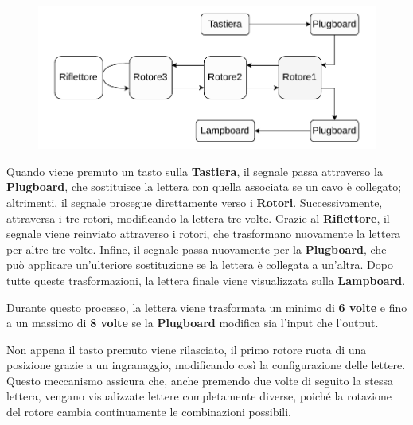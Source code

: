 \documentclass{rapport}
\begin{document}
\begin{figure}[h]
    \centering
    \includegraphics[width=0.9\linewidth]{logos/2_7cripto.pdf}
\end{figure}

Quando viene premuto un tasto sulla \textbf{Tastiera}, il segnale passa attraverso la \textbf{Plugboard}, che sostituisce la lettera con quella associata se un cavo è collegato; altrimenti, il segnale prosegue direttamente verso i \textbf{Rotori}. Successivamente, attraversa i tre rotori, modificando la lettera tre volte. Grazie al \textbf{Riflettore}, il segnale viene reinviato attraverso i rotori, che trasformano nuovamente la lettera per altre tre volte. Infine, il segnale passa nuovamente per la \textbf{Plugboard}, che può applicare un'ulteriore sostituzione se la lettera è collegata a un'altra. Dopo tutte queste trasformazioni, la lettera finale viene visualizzata sulla \textbf{Lampboard}. 

Durante questo processo, la lettera viene trasformata un minimo di \textbf{6 volte} e fino a un massimo di \textbf{8 volte} se la \textbf{Plugboard} modifica sia l'input che l'output.

Non appena il tasto premuto viene rilasciato, il primo rotore ruota di una posizione grazie a un ingranaggio, modificando così la configurazione delle lettere. Questo meccanismo assicura che, anche premendo due volte di seguito la stessa lettera, vengano visualizzate lettere completamente diverse, poiché la rotazione del rotore cambia continuamente le combinazioni possibili. 
\end{document}
